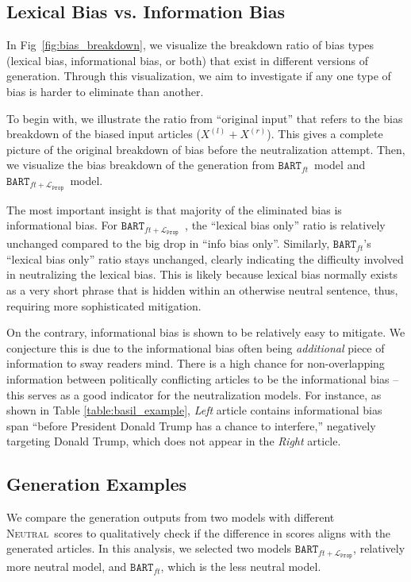 \documentclass[11pt,a4paper]{article}
\newcommand{\neutral}{\textsc{Neutral}}
\newcommand{\finetune}{$\texttt{BART}_{ft}$}
\newcommand{\prop}{$\texttt{BART}_{ft+\mathcal{L}_\texttt{Prop}}$}
\begin{document}
\subsection{Lexical Bias vs. Information Bias}
In Fig~\ref{fig:bias_breakdown}, 
we visualize the breakdown ratio of bias types (lexical bias, informational bias, or both) that exist in different versions of generation.
Through this visualization, we aim to investigate if any one type of bias is harder to eliminate than another. 

To begin with, we illustrate the ratio from ``original input'' that refers to the bias breakdown of the biased input articles ($X^{(l)}+X^{(r)}$). This gives a complete picture of the original breakdown of bias before the neutralization attempt. 
Then, we visualize the bias breakdown of the generation from \finetune~model and \prop~model. 

The most important insight is that majority of the eliminated bias is informational bias. For \prop~, the ``lexical bias only'' ratio is relatively unchanged compared to the big drop in ``info bias only''. Similarly, \finetune's ``lexical bias only'' ratio stays unchanged, clearly indicating the difficulty involved in neutralizing the lexical bias. This is likely because lexical bias normally exists as a very short phrase that is hidden within an otherwise neutral sentence, thus, requiring more sophisticated mitigation.

On the contrary, informational bias is shown to be relatively easy to mitigate. We conjecture this is due to the informational bias often being \textit{additional} piece of information to sway readers mind. There is a high chance for non-overlapping information between politically conflicting articles to be the informational bias -- this serves as a good indicator for the neutralization models.
For instance, as shown in Table \ref{table:basil_example}, \textit{Left} article contains informational bias span ``before President Donald Trump has a chance to interfere,'' negatively targeting Donald Trump, which does not appear in the \textit{Right} article.

\subsection{Generation Examples}
We compare the generation outputs from two models with different 
\neutral~scores to qualitatively check if the difference in scores aligns with the generated articles. In this analysis, we selected two models \prop, relatively more neutral model, and \finetune, which is the less neutral model. 
\end{document}
